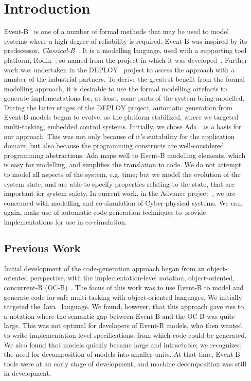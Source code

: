 \section{Introduction}\label{intro}
Event-B~\cite{ABR10} is one of a number of formal methods that may be used to model systems where a high degree of reliability is required. Event-B was inspired by its predecessor, \emph{Classical-B}~\cite{TheBBook}. It is a modelling language, used with a supporting tool platform, Rodin~\cite{abrial10rodin}; so named from the project in which it was developed~\cite{RodinTool}. Further work was undertaken in the DEPLOY~\cite{DEPLOY} project to assess the approach with a number of the industrial partners. To derive the greatest benefit from the formal modelling approach, it is desirable to use the formal modelling artefacts to generate implementations for, at least, some parts of the system being modelled. During the latter stages of the DEPLOY project, automatic generation from Event-B models began to evolve, as the platform stabilized, where we targeted multi-tasking, embedded control systems. Initially, we chose Ada~\cite{ada2005} as a basis for our approach. This was not only because of it's suitability for the application domain, but also because the programming constructs are well-considered programming abstractions. Ada maps well to Event-B modelling elements, which is easy for modelling, and simplifies the translation to code. We do not attempt to model all aspects of the system, e.g. time; but we model the evolution of the system state, and are able to specify properties relating to the state, that are important for system safety. In current work, in the Advance project~\cite{advance}, we are concerned with modelling and co-simulation of Cyber-physical systems. We can, again, make use of automatic code-generation techniques to provide implementations for use in co-simulation.    


\subsection{Previous Work}
Initial development of the code-generation approach began from an object-oriented perspective, with the implementation-level notation, object-oriented, concurrent-B (OC-B)~\cite{Edmunds2009}. The focus of this work was to use Event-B  to model and generate code for safe multi-tasking with object-oriented languages. We initially targeted the Java~\cite{JavaSpec} language. We found, however, that this approach gave rise to a notation where the semantic gap between Event-B and the OC-B was quite large. This was not optimal for developers of Event-B models, who then wanted to write implementation-level specifications, from which code could be generated. We also found that models quickly became large and intractable; we recognized the need for decomposition of models into smaller units. At that time, Event-B tools were at an early stage of development, and machine decomposition was still in development. 

